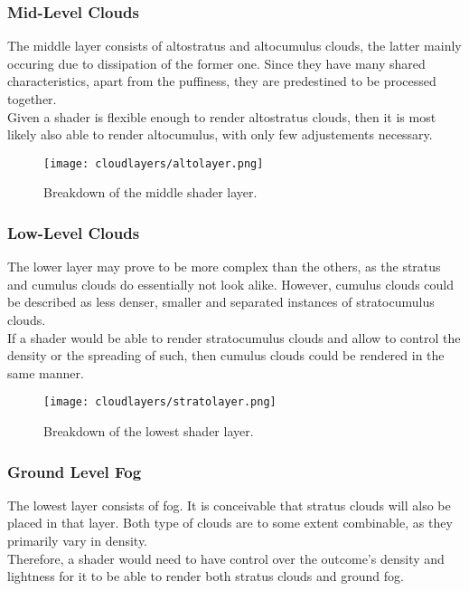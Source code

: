 \subsubsection{Mid-Level Clouds}
\label{section:impl:layers:mid}
The middle layer consists of altostratus and altocumulus clouds, the latter mainly occuring due to dissipation of the former one.
Since they have many shared characteristics, apart from the puffiness, they are predestined to be processed together.
\\
Given a \gls{shader} is flexible enough to render altostratus clouds, then it is most likely also able to render altocumulus, with only few adjustements necessary.

\begin{figure}[H]
    \texttt{[image: cloudlayers/altolayer.png]}
    \caption{Breakdown of the middle shader layer.}
    \label{img:cloudlayer:alto}
\end{figure}

\pagebreak

\subsubsection{Low-Level Clouds}
\label{section:impl:layers:low}
The lower layer may prove to be more complex than the others, as the stratus and cumulus clouds do essentially not look alike.
However, cumulus clouds could be described as less denser, smaller and separated instances of stratocumulus clouds.
\\
If a \gls{shader} would be able to render stratocumulus clouds and allow to control the density or the spreading of such, then cumulus clouds could be rendered in the same manner.

\begin{figure}[H]
    \texttt{[image: cloudlayers/stratolayer.png]}
    \caption{Breakdown of the lowest shader layer.}
    \label{img:cloudlayer:strato}
\end{figure}


\subsubsection{Ground Level Fog}
\label{section:impl:layers:fog}
The lowest layer consists of fog. It is conceivable that stratus clouds will also be placed in that layer.
Both type of clouds are to some extent combinable, as they primarily vary in density.
\\
Therefore, a \gls{shader} would need to have control over the outcome's density and lightness for it to be able to render both stratus clouds and ground fog.

